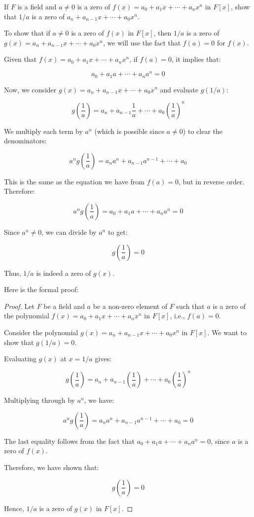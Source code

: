 \documentclass[12pt]{amsart}
\theoremstyle{definition}
\numberwithin{equation}{section}
\theoremstyle{plain}
\begin{document}
\vspace*{20pt}
\begin{exercise}{35} If $F$ is a field and $a \neq 0$ is a zero of $f(x) = a_0 + a_1x + \cdots +a_nx^n$ in $F[x]$, show that $1/a$ is a zero of
    $a_n + a_{n-1}x + \cdots + a_0x^n$.

    
    To show that if \( a \neq 0 \) is a zero of \( f(x) \) in \( F[x] \), then \( 1/a \) is a zero of \( g(x) = a_n + a_{n-1}x + \cdots + a_0x^n \), we will use the fact that \( f(a) = 0 \) for \( f(x) \).

Given that \( f(x) = a_0 + a_1x + \cdots + a_nx^n \), if \( f(a) = 0 \), it implies that:

\[
a_0 + a_1a + \cdots + a_na^n = 0
\]

Now, we consider \( g(x) = a_n + a_{n-1}x + \cdots + a_0x^n \) and evaluate \( g(1/a) \):

\[
g\left(\frac{1}{a}\right) = a_n + a_{n-1}\frac{1}{a} + \cdots + a_0\left(\frac{1}{a}\right)^n
\]

We multiply each term by \( a^n \) (which is possible since \( a \neq 0 \)) to clear the denominators:

\[
a^n g\left(\frac{1}{a}\right) = a_n a^n + a_{n-1}a^{n-1} + \cdots + a_0
\]

This is the same as the equation we have from \( f(a) = 0 \), but in reverse order. Therefore:

\[
a^n g\left(\frac{1}{a}\right) = a_0 + a_1a + \cdots + a_na^n = 0
\]

Since \( a^n \neq 0 \), we can divide by \( a^n \) to get:

\[
g\left(\frac{1}{a}\right) = 0
\]

Thus, \( 1/a \) is indeed a zero of \( g(x) \). 

Here is the formal proof:

\begin{proof}
Let \( F \) be a field and \( a \) be a non-zero element of \( F \) such that \( a \) is a zero of the polynomial \( f(x) = a_0 + a_1x + \cdots + a_nx^n \) in \( F[x] \), i.e., \( f(a) = 0 \).

Consider the polynomial \( g(x) = a_n + a_{n-1}x + \cdots + a_0x^n \) in \( F[x] \). We want to show that \( g(1/a) = 0 \).

Evaluating \( g(x) \) at \( x = 1/a \) gives:

\[
g\left(\frac{1}{a}\right) = a_n + a_{n-1}\left(\frac{1}{a}\right) + \cdots + a_0\left(\frac{1}{a}\right)^n
\]

Multiplying through by \( a^n \), we have:

\[
a^n g\left(\frac{1}{a}\right) = a_n a^n + a_{n-1}a^{n-1} + \cdots + a_0 = 0
\]

The last equality follows from the fact that \( a_0 + a_1a + \cdots + a_na^n = 0 \), since \( a \) is a zero of \( f(x) \).

Therefore, we have shown that:

\[
g\left(\frac{1}{a}\right) = 0
\]

Hence, \( 1/a \) is a zero of \( g(x) \) in \( F[x] \).
\end{proof}
\end{exercise}
\vspace*{60pt}
\end{document}

